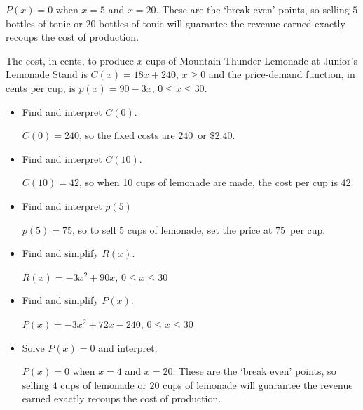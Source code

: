 \documentclass{ximera}
\begin{document}
\begin{question}
\begin{problem}
\begin{itemize}
\begin{solution}
    $P(x) = 0$ when $x = 5$ and $x=20$.  These are the `break even' points, so selling $5$ bottles of tonic or $20$ bottles of tonic will guarantee the revenue earned exactly recoups the cost of production.
\end{solution}
\end{itemize}
\end{problem}  

\begin{problem}
The cost, in cents, to produce $x$ cups of Mountain Thunder Lemonade at Junior's Lemonade Stand  is $C(x) = 18x + 240$, $x \geq 0$ and the price-demand function, in cents per cup,  is $p(x) = 90-3x$, $0 \leq x \leq 30$.

\begin{itemize}

\item  Find and interpret $C(0)$.

\begin{solution}
    $C(0) = 240$, so the fixed costs are $240$\textcent \,  or $\$2.40$.
\end{solution}
\item  Find and interpret $\overline{C}(10)$.

\begin{solution}
    $\overline{C}(10) = 42$, so when 10 cups of lemonade are made, the cost per cup is $42$\textcent.
\end{solution}
\item  Find and interpret $p(5)$

\begin{solution}
    $p(5) = 75$, so to sell $5$ cups of lemonade, set the price at $75$\textcent \,  per cup.
\end{solution}
\item  Find and simplify $R(x)$.

\begin{solution}
    $R(x) = -3x^2+90x$, $0 \leq x \leq 30$
\end{solution}
\item  Find and simplify $P(x)$.

\begin{solution}
    $P(x) = -3x^2+72x-240$, $0 \leq x \leq 30$
\end{solution}
\item  Solve $P(x) = 0$ and interpret.

\begin{solution}
    $P(x) = 0$ when $x = 4$ and $x=20$.  These are the `break even' points, so selling $4$ cups of lemonade or $20$ cups of lemonade will guarantee the revenue earned exactly recoups the cost of production.
\end{solution}
\end{itemize}
\end{problem} 


\end{question}
\end{document}
